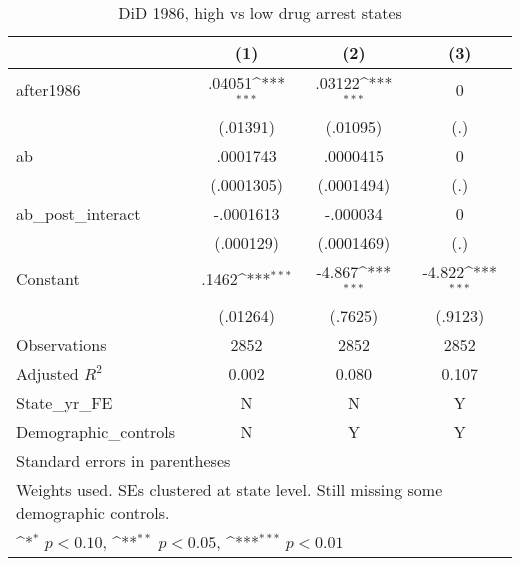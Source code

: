 \begin{table}[htbp]\centering
\def\sym#1{\ifmmode^{#1}\else\(^{#1}\)\fi}
\caption{DiD 1986, high vs low drug arrest states}
\begin{tabular}{l*{3}{c}}
\hline\hline
                    &\multicolumn{1}{c}{(1)}         &\multicolumn{1}{c}{(2)}         &\multicolumn{1}{c}{(3)}         \\
\hline
after1986           &      .04051\sym{***}&      .03122\sym{***}&           0         \\
                    &    (.01391)         &    (.01095)         &         (.)         \\
[1em]
ab                  &    .0001743         &    .0000415         &           0         \\
                    &  (.0001305)         &  (.0001494)         &         (.)         \\
[1em]
ab\_post\_interact    &   -.0001613         &    -.000034         &           0         \\
                    &   (.000129)         &  (.0001469)         &         (.)         \\
[1em]
Constant            &       .1462\sym{***}&      -4.867\sym{***}&      -4.822\sym{***}\\
                    &    (.01264)         &     (.7625)         &     (.9123)         \\
\hline
Observations        &        2852         &        2852         &        2852         \\
Adjusted \(R^{2}\)  &       0.002         &       0.080         &       0.107         \\
State\_yr\_FE         &           N         &           N         &           Y         \\
Demographic\_controls&           N         &           Y         &           Y         \\
\hline\hline
\multicolumn{4}{l}{\footnotesize Standard errors in parentheses}\\
\multicolumn{4}{l}{\footnotesize Weights used. SEs clustered at state level. Still missing some demographic controls.}\\
\multicolumn{4}{l}{\footnotesize \sym{*} \(p<0.10\), \sym{**} \(p<0.05\), \sym{***} \(p<0.01\)}\\
\end{tabular}
\end{table}
